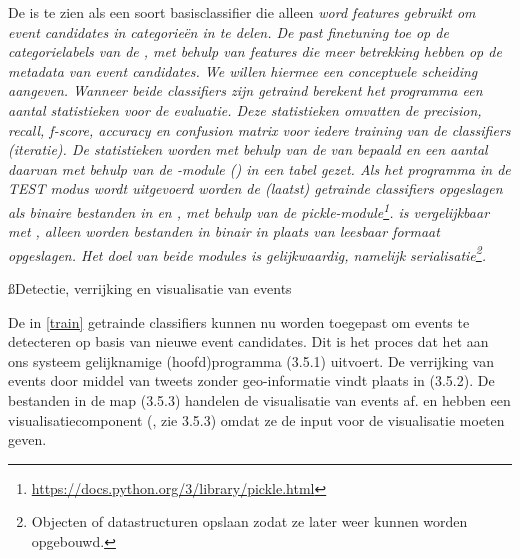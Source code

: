 {{De  is te zien als een soort basisclassifier die alleen \it{word 
features} gebruikt om event candidates in categorie\"en in te delen. De 
 past \it{finetuning} toe op de categorielabels van de 
, met behulp van features die meer betrekking hebben op de 
\it{metadata} van event candidates. We willen hiermee een conceptuele scheiding aangeven.
\vl
Wanneer beide classifiers zijn getraind berekent het programma een aantal 
statistieken voor de evaluatie. Deze statistieken omvatten de \it{precision}, \it{recall}, 
\it{f-score}, \it{accuracy} en \it{confusion matrix} voor iedere training van de classifiers 
(iteratie). De statistieken worden met behulp van de  van  bepaald en 
een aantal daarvan met behulp van de -module () 
in een tabel gezet.
\vl
Als het programma in de TEST modus wordt uitgevoerd worden de (laatst) getrainde 
classifiers opgeslagen als binaire bestanden in 
 en , 
met behulp van de pickle-module\footnote{\url{https://docs.python.org/3/library/pickle.html}}.
 is vergelijkbaar met , alleen worden bestanden in binair in plaats van
leesbaar formaat opgeslagen. Het doel van beide modules is gelijkwaardig, namelijk
\it{serialisatie}\footnote{Objecten of datastructuren opslaan zodat ze later weer kunnen 
worden opgebouwd.}.

\ss{Detectie, verrijking en visualisatie van events}\label{detect}

De in \ref{train} getrainde classifiers kunnen nu worden toegepast om events te 
detecteren op basis van nieuwe event candidates. Dit is het proces dat het aan 
ons systeem gelijknamige (hoofd)programma  (3.5.1) uitvoert. De 
verrijking van events door middel van tweets zonder geo-informatie vindt plaats 
in  (3.5.2). De bestanden in de map  (3.5.3) handelen 
de visualisatie van events af.  en  hebben een 
visualisatiecomponent (, zie 3.5.3) omdat ze de input voor de 
visualisatie moeten geven.

\label{EventDetective}

}}
